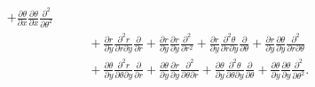 \documentclass[oneside]{article}
\begin{document}
\begin{enumerate}[label=\textbf{\arabic*.}]
\begin{align*}
      + \frac{\partial\theta}{\partial x}
        \frac{\partial\theta}{\partial x}\frac{\partial^2}{\partial\theta^2} \\
  &\qquad+ \frac{\partial r}{\partial y}
           \frac{\partial^2 r}{\partial r\partial y}\frac{\partial}{\partial r}
      + \frac{\partial r}{\partial y}
           \frac{\partial r}{\partial y}\frac{\partial^2}{\partial r^2}
      + \frac{\partial r}{\partial y}
        \frac{\partial^2 \theta}{\partial r\partial y}
        \frac{\partial}{\partial\theta}
      + \frac{\partial r}{\partial y}
        \frac{\partial\theta}{\partial y}
        \frac{\partial^2}{\partial r\partial\theta} \\
  &\qquad+ \frac{\partial\theta}{\partial y}
           \frac{\partial^2 r}{\partial\theta\partial y}\frac{\partial}{\partial r}
      + \frac{\partial\theta}{\partial y}
           \frac{\partial r}{\partial y}\frac{\partial^2}{\partial\theta\partial r}
      + \frac{\partial\theta}{\partial y}
         \frac{\partial^2 \theta}{\partial\theta\partial y}\frac{\partial}{\partial\theta}
      + \frac{\partial\theta}{\partial y}
         \frac{\partial\theta}{\partial y}\frac{\partial^2}{\partial\theta^2} \text{.}
\end{align*}


\end{enumerate}
\end{document}
